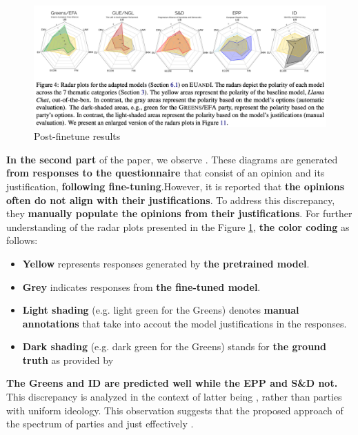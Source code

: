 \begin{figure}[htbp]
    \centering
    \includegraphics[width=\textwidth]{figures/literature_review/radar_results_chalkidis2024.png} 
    \caption{Post-finetune results \cite[Chalkidis et al. (2024)]{chalkidis2024llama}}
    \label{fig:radarchalkidis2024}
\end{figure}

\textbf{In the second part} of the paper, we observe . These diagrams are generated \textbf{from responses to the questionnaire \cite{michel2019euandi2019}} that consist of an opinion and its justification, \textbf{following fine-tuning}.However, it is reported that \textbf{the opinions often do not align with their justifications}. To address this discrepancy, they \textbf{manually populate the opinions from their justifications}. For further understanding of the radar plots presented in the Figure \ref*{fig:radarchalkidis2024}, \textbf{the color coding} as follows:
\newpage
\begin{itemize}
    \item \textbf{Yellow} represents responses generated by \textbf{the pretrained model}.
    \item \textbf{Grey} indicates responses from \textbf{the fine-tuned model}.
    \item \textbf{Light shading} (e.g. light green for the Greens) denotes \textbf{manual annotations} that take into accout the model justifications in the responses. 
    \item \textbf{Dark shading} (e.g. dark green for the Greens) stands for \textbf{the ground truth} as provided by \cite[Michel et al. (2019)]{michel2019euandi2019}
\end{itemize}

\textbf{The Greens and ID are predicted well while the EPP and S\&D not.} This discrepancy is analyzed in the context of latter being , rather than parties with uniform ideology. This observation suggests that the proposed approach  of the spectrum of parties and just effectively .

